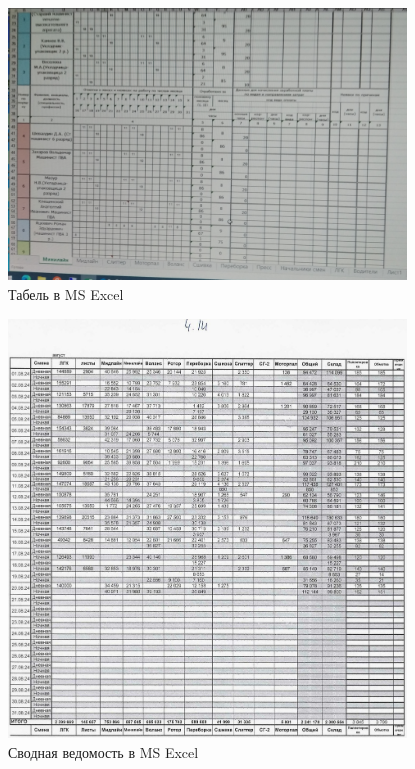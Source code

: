 \begin{figure}
\begin{center}
  \includegraphics[height=0.94\textheight, width=0.94\textwidth, keepaspectratio]{Pics 1/4 рабочее время в эксель.png}
\end{center}
  \caption{Табель в MS Excel}
  \label{pic:4 рабочее время в эксель}
\end{figure}

\begin{figure}
\begin{center}
  \includegraphics[height=0.94\textheight, width=0.94\textwidth, keepaspectratio]{Pics 1/4.14 сводная ведомость_0001.jpg}
\end{center}
  \caption{Сводная ведомость в MS Excel}
  \label{pic:4.14 сводная ведомость_0001}
\end{figure}


